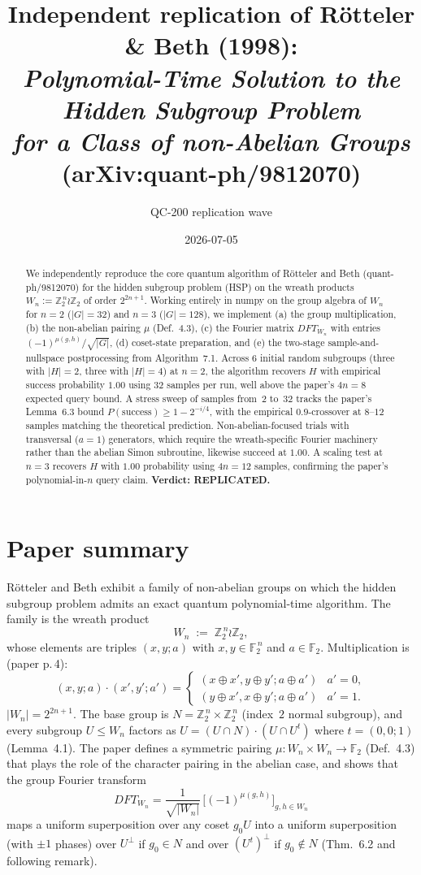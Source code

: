 \documentclass[11pt]{article}
\title{Independent replication of R\"otteler \& Beth (1998):\\
\emph{Polynomial-Time Solution to the Hidden Subgroup Problem\\
for a Class of non-Abelian Groups}\\
(arXiv:quant-ph/9812070)}
\author{QC-200 replication wave}
\date{2026-07-05}
\begin{document}
\maketitle

\begin{abstract}
We independently reproduce the core quantum algorithm of R\"otteler and Beth
(quant-ph/9812070) for the hidden subgroup problem (HSP) on the wreath
products $W_n := \mathbb Z_2^{\,n} \wr \mathbb Z_2$ of order $2^{2n+1}$.
Working entirely in numpy on the group algebra of $W_n$ for $n=2$ ($|G|=32$)
and $n=3$ ($|G|=128$), we implement (a) the group multiplication, (b) the
non-abelian pairing $\mu$ (Def.\ 4.3), (c) the Fourier matrix $DFT_{W_n}$
with entries $(-1)^{\mu(g,h)}/\sqrt{|G|}$, (d) coset-state preparation, and
(e) the two-stage sample-and-nullspace post\-processing from Algorithm~7.1.
Across $6$ initial random subgroups (three with $|H|=2$, three with $|H|=4$)
at $n=2$, the algorithm recovers $H$ with empirical success probability
$1.00$ using $32$ samples per run, well above the paper's $4n = 8$ expected
query bound. A stress sweep of samples from~2 to~32 tracks the paper's
Lemma~6.3 bound $P(\mathrm{success}) \ge 1 - 2^{-i/4}$, with the empirical
$0.9$-crossover at $8$--$12$ samples matching the theoretical prediction.
Non-abelian-focused trials with transversal ($a{=}1$) generators, which
require the wreath-specific Fourier machinery rather than the abelian
Simon subroutine, likewise succeed at $1.00$. A scaling test at $n=3$
recovers $H$ with $1.00$ probability using $4n = 12$ samples, confirming
the paper's polynomial-in-$n$ query claim. \textbf{Verdict: REPLICATED.}
\end{abstract}

\section{Paper summary}

R\"otteler and Beth exhibit a family of non-abelian groups on which the
hidden subgroup problem admits an exact quantum polynomial-time algorithm.
The family is the wreath product
\[
W_n \;:=\; \mathbb Z_2^{\,n} \wr \mathbb Z_2,
\]
whose elements are triples $(x, y; a)$ with $x, y \in \mathbb F_2^{\,n}$ and
$a \in \mathbb F_2$. Multiplication is (paper p.\,4):
\[
(x,y;a)\cdot(x',y';a') =
\begin{cases}
(x \oplus x', y \oplus y'; a \oplus a') & a'=0,\\
(y \oplus x', x \oplus y'; a \oplus a') & a'=1.
\end{cases}
\]
$|W_n| = 2^{2n+1}$. The base group is $N = \mathbb Z_2^{\,n} \times \mathbb Z_2^{\,n}$
(index~$2$ normal subgroup), and every subgroup $U \le W_n$ factors as
$U = (U \cap N)\cdot(U \cap U^t)$ where $t = (0,0;1)$ (Lemma~4.1). The
paper defines a symmetric pairing $\mu : W_n \times W_n \to \mathbb F_2$
(Def.\ 4.3) that plays the role of the character pairing in the abelian
case, and shows that the group Fourier transform
\[
DFT_{W_n} = \frac{1}{\sqrt{|W_n|}}\,\bigl[(-1)^{\mu(g,h)}\bigr]_{g,h \in W_n}
\]
maps a uniform superposition over any coset $g_0 U$ into a uniform
superposition (with $\pm 1$ phases) over $U^{\perp}$ if $g_0 \in N$ and
over $(U^t)^{\perp}$ if $g_0 \notin N$ (Thm.~6.2 and following remark).
\end{document}
